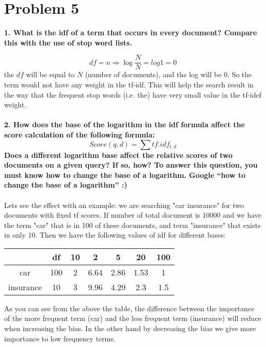 \documentclass{article}
\begin{document}
\pagebreak


\section{Problem 5}

\textbf{1. What is the idf of a term that occurs in every document? Compare this with the use of stop word lists.}

$$ df=n \Rightarrow \log \frac{N}{N} = log1 = 0 $$
the $df$ will be equal to $N$ (number of documents), and the log will be 0. So the term would not have any weight in the tf-idf. This will help the search result in the way that the frequent stop words (i.e. the) have very small value in the tf-idef weight. 
\\
\\
\textbf{2. How does the base of the logarithm in the idf formula affect the score calculation of the following formula:}
$$Score(q, d) = \sum tf.idf_{t,d}$$
\textbf{Does a different logarithm base affect the relative scores of two documents on a given query? If so, how? To answer this question, you must know how to change the base of a logarithm. Google “how to change the base of a logarithm” :)}
\\\\
Lets see the effect with an example: we are searching "car insurance" for two documents with fixed tf scores. If number of total document is 10000 and we have the term "car" that is in 100 of these documents, and term "insurance" that exists in only 10. Then we have the following values of idf for different bases:

\begin{center}

\begin{tabular}{ c|c|c|c|c|c|c } 

 & df & 10 & 2 & 5 & 20 & 100 \\ 
 \hline
 car  & 100 & 2  & 6.64 & 2.86  & 1.53 & 1\\ 
 insurance & 10 & 3 & 9.96 & 4.29 &  2.3 & 1.5\\ 
 
 \end{tabular}
\end{center}

As you can see from the above the table, the difference between the importance of the more frequent term (car) and the less frequent term (insurance) will reduce when increasing the bias. In the other hand by decreasing the bias we give more importance to low frequency terms.  

\pagebreak


%
\end{document}
